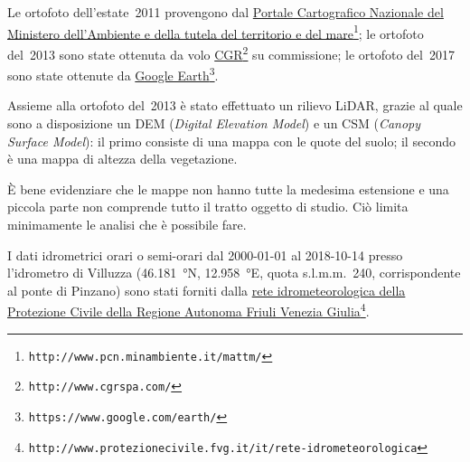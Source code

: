 Le ortofoto dell'estate~2011 provengono dal \href{http://www.pcn.minambiente.it/mattm/}{Portale Cartografico Nazionale del Ministero dell'Ambiente e della tutela del territorio e del mare}\footnote{\texttt{http://www.pcn.minambiente.it/mattm/}};
le ortofoto del~2013 sono state ottenuta da volo \href{http://www.cgrspa.com/}{CGR}\footnote{\texttt{http://www.cgrspa.com/}} su commissione; 
le ortofoto del~2017 sono state ottenute da \href{https://www.google.com/earth/}{Google Earth}\footnote{\texttt{https://www.google.com/earth/}}.

Assieme alla ortofoto del~2013 è stato effettuato un rilievo LiDAR, grazie al quale sono a disposizione un DEM (\emph{Digital Elevation Model}) e un CSM (\emph{Canopy Surface Model}): il primo consiste di una mappa con le quote del suolo; il secondo è una mappa di altezza della vegetazione.

È bene evidenziare che le mappe non hanno tutte la medesima estensione e una piccola parte non comprende tutto il tratto oggetto di studio.
Ciò limita minimamente le analisi che è possibile fare.

I dati idrometrici orari o semi-orari dal 2000-01-01 al 2018-10-14 presso l'idrometro di Villuzza (\SI{46.181}{\degree}N, \SI{12.958}{\degree}E, quota s.l.m.m.~\num{240}, corrispondente al ponte di Pinzano) sono stati forniti dalla \href{http://www.protezionecivile.fvg.it/it/rete-idrometeorologica}{rete idrometeorologica della Protezione Civile della Regione Autonoma Friuli Venezia Giulia}\footnote{\texttt{http://www.protezionecivile.fvg.it/it/rete-idrometeorologica}}.

